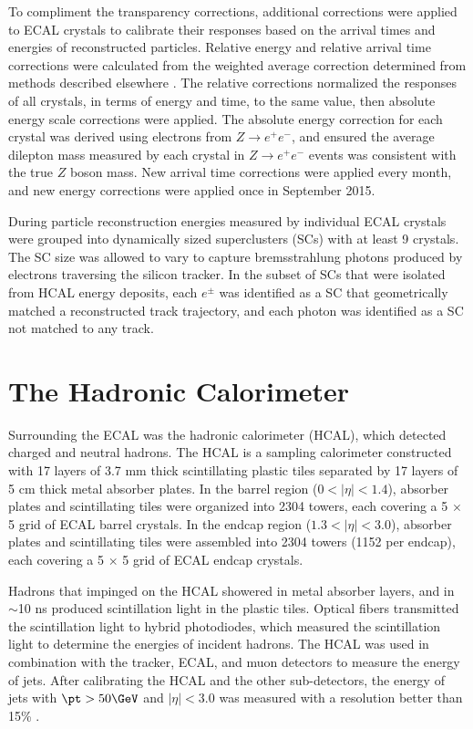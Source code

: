 To compliment the transparency corrections, additional corrections were applied to ECAL crystals 
to calibrate their responses based on the arrival times and energies of reconstructed particles.  Relative energy 
and relative arrival time corrections were calculated from 
the weighted average correction determined from methods described elsewhere \cite{eGammaMonitCalib2011}.  
The relative corrections normalized the responses of all crystals, in terms of energy and time, to the same value, then 
absolute energy scale corrections were applied.  The absolute energy correction for each crystal was derived using 
electrons from $Z \rightarrow e^{+}e^{-}$, and ensured the average dilepton mass measured by each crystal in 
$Z \rightarrow e^{+}e^{-}$ events was consistent with the true $Z$ boson mass.  New arrival time corrections 
were applied every month, and new energy corrections were applied once in September 2015.

During particle reconstruction energies measured by individual ECAL crystals were grouped into dynamically 
sized superclusters (SCs) with at least 9 crystals.  The SC size was allowed to vary to capture bremsstrahlung 
photons produced by electrons traversing the silicon tracker.  In the subset of SCs that were isolated 
from HCAL energy deposits, each $e^{\pm}$ was identified as a SC that geometrically matched a reconstructed track 
trajectory, and each photon was identified as a SC not matched to any track.


\section{The Hadronic Calorimeter}
\label{sec:hcalDescription}
Surrounding the ECAL was the hadronic calorimeter (HCAL), which detected charged and neutral hadrons.  The 
HCAL is a sampling calorimeter constructed with 17 layers of 3.7 mm thick scintillating plastic tiles separated by 
17 layers of 5 cm thick metal absorber plates.  In the barrel 
region ($0 < |\eta| < 1.4$), absorber plates and scintillating tiles were organized into 2304 towers, each 
covering a 5 $\times$ 5 grid of ECAL barrel crystals.  In the endcap region ($1.3 < |\eta| < 3.0$), absorber 
plates and scintillating tiles were assembled into 2304 towers (1152 per endcap), each covering 
a 5 $\times$ 5 grid of ECAL endcap crystals.

Hadrons that impinged on the HCAL showered in metal absorber layers, and in $\sim$10 ns produced scintillation 
light in the plastic tiles.  Optical fibers transmitted the scintillation light to hybrid photodiodes, 
which measured the scintillation light to determine the energies of incident hadrons.  The HCAL was used in 
combination with the tracker, ECAL, and muon detectors to measure the energy of jets.  After calibrating the 
HCAL and the other sub-detectors, the energy of jets with $\pt > 50\GeV$ and $|\eta| < 3.0$ was measured with 
a resolution better than 15\% \cite{jetResolutionInCollisions}.

